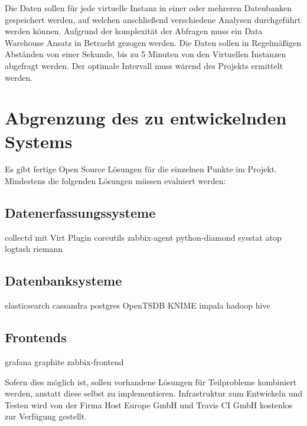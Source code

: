 Die Daten sollen für jede virtuelle Instanz in einer oder mehreren Datenbanken
gespeichert werden, auf welchen anschließend verschiedene Analysen
durchgeführt werden können. Aufgrund der komplexität der Abfragen muss ein
Data Warehouse Ansatz in Betracht gezogen werden. Die Daten sollen in
Regelmäßigen Abständen von einer Sekunde, bis zu 5 Minuten von den Virtuellen
Instanzen abgefragt werden. Der optimale Intervall muss wärend des Projekts
ermittelt werden.

\section{Abgrenzung des zu entwickelnden Systems}

Es gibt fertige Open Source Lösungen für die einzelnen Punkte im Projekt.
Mindestens die folgenden Lösungen müssen evaluiert werden:

\subsection{Datenerfassungssysteme}

\begin{outline}
  \1 collectd mit Virt Plugin
  \1 coreutils
  \1 zabbix-agent
  \1 python-diamond
  \1 sysstat
  \1 atop
  \1 logtash
  \1 riemann
\end{outline}

\subsection{Datenbanksysteme}

\begin{outline}
  \1 elasticsearch
  \1 cassandra
  \1 postgres
  \1 OpenTSDB
  \1 KNIME
  \1 impala
  \1 hadoop
  \1 hive
\end{outline}

\subsection{Frontends}

\begin{outline}
  \1 grafana
  \1 graphite
  \1 zabbix-frontend
\end{outline}

Sofern dies möglich ist, sollen vorhandene Lösungen für Teilprobleme
kombiniert werden, anstatt diese selbst zu implementieren. Infrastruktur zum
Entwickeln und Testen wird von der Firma Host Europe GmbH und Travis CI GmbH
kostenlos zur Verfügung gestellt.

